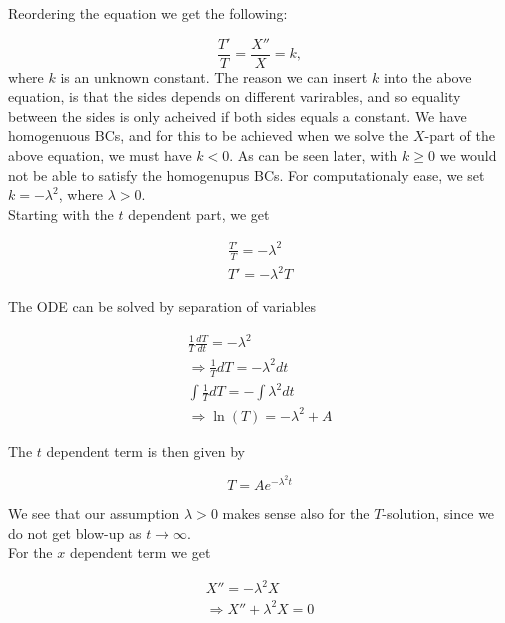 \documentclass{article}
\begin{document}
Reordering the equation we get the following:

\begin{equation}
\frac{T'}{T} = \frac{X''}{X} = k,
\end{equation}
where $k$ is an unknown constant. The reason we can insert $k$ into the above equation, is that the sides depends on different varirables, and so equality between the sides is only acheived if both sides equals a constant. We have homogenuous BCs, and for this to be achieved when we solve the $X$-part of the above equation, we must have $k <0$. As can be seen later, with $k\geq 0$ we would not be able to satisfy the homogenupus BCs. For computationaly ease, we set $k = -\lambda^2$, where $\lambda > 0$. \\

Starting with the $t$ dependent part, we get

\begin{eqnarray}
\frac{T'}{T} = -\lambda^2 \\ 
T' = -\lambda^2 T
\end{eqnarray}

The ODE can be solved by separation of variables

\begin{subequations}
	\begin{eqnarray}
	\label{eqn:solvingTdependentTransientTerm1D}
	\frac{1}{T}\frac{dT}{dt} = -\lambda^2 \\ 
	\Rightarrow \frac{1}{T} dT = -\lambda^2 dt\\
	\int \frac{1}{T}dT = - \int \lambda^2 dt \\
	\Rightarrow \ln(T) = -\lambda^2 + A
	\end{eqnarray}
\end{subequations}

The $t$ dependent term is then given by

\begin{equation}
T = Ae^{-\lambda^2 t}
\label{eqn:tdependentTransientTerm1D}
\end{equation}

We see that our assumption $\lambda > 0$ makes sense also for the $T$-solution, since we do not get blow-up as $t \rightarrow \infty$. \\

For the $x$ dependent term we get

\begin{subequations}
	\begin{eqnarray}
	X'' = -\lambda^2 X \\
	\Rightarrow X'' + \lambda^2 X = 0 
	\end{eqnarray}
\end{subequations}
\end{document}
